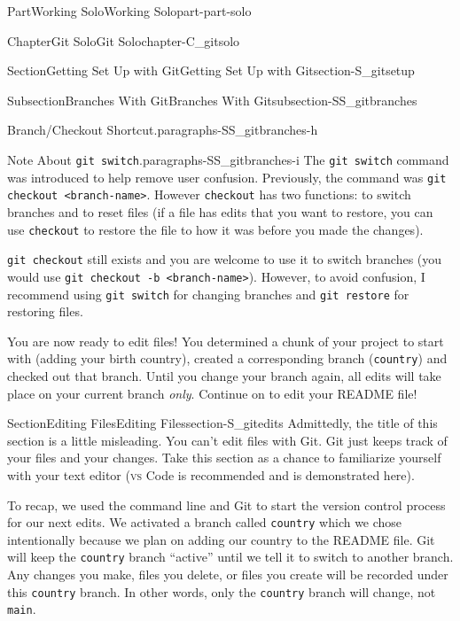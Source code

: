 \documentclass[oneside,10pt,]{book}
\newcommand{\mono}[1]{\texttt{#1}}
\newcommand{\initialism}[1]{\textsc{\MakeLowercase{#1}}}
\begin{document}
\begin{partptx}{Part}{Working Solo}{}{Working Solo}{}{}{part-part-solo}
\begin{chapterptx}{Chapter}{Git Solo}{}{Git Solo}{}{}{chapter-C_gitsolo}
\begin{sectionptx}{Section}{Getting Set Up with Git}{}{Getting Set Up with Git}{}{}{section-S_gitsetup}
\begin{subsectionptx}{Subsection}{Branches With Git}{}{Branches With Git}{}{}{subsection-SS_gitbranches}
\begin{paragraphs}{Branch\slash{}Checkout Shortcut.}{paragraphs-SS_gitbranches-h}
\end{paragraphs}%
\begin{paragraphs}{Note About \mono{git switch}.}{paragraphs-SS_gitbranches-i}%
The \mono{git switch} command was introduced to help remove user confusion. Previously, the command was \mono{git checkout <branch-name>}. However \mono{checkout} has two functions: to switch branches and to reset files (if a file has edits that you want to restore, you can use \mono{checkout} to restore the file to how it was before you made the changes).%
\par
\mono{git checkout} still exists and you are welcome to use it to switch branches (you would use \mono{git checkout -b <branch-name>}). However, to avoid confusion, I recommend using \mono{git switch} for changing branches and \mono{git restore} for restoring files.%
\end{paragraphs}%
\end{subsectionptx}
\begin{conclusion}{}%
You are now ready to edit files! You determined a chunk of your project to start with (adding your birth country), created a corresponding branch (\mono{country}) and checked out that branch. Until you change your branch again, all edits will take place on your current branch \emph{only}. Continue on to edit your README file!%
\end{conclusion}%
\end{sectionptx}
%
%
\typeout{************************************************}
\typeout{************************************************}
%
\begin{sectionptx}{Section}{Editing Files}{}{Editing Files}{}{}{section-S_gitedits}
%
%
%
Admittedly, the title of this section is a little misleading. You can't edit files with Git. Git just keeps track of your files and your changes. Take this section as a chance to familiarize yourself with your text editor (\initialism{VS} Code is recommended and is demonstrated here).%
\par
To recap, we used the command line and Git to start the version control process for our next edits. We activated a branch called \mono{country} which we chose intentionally because we plan on adding our country to the README file. Git will keep the \mono{country} branch ``active'' until we tell it to switch to another branch. Any changes you make, files you delete, or files you create will be recorded under this \mono{country} branch. In other words, only the \mono{country} branch will change, not \mono{main}.%

\end{sectionptx}
\end{chapterptx}
\end{partptx}
\end{document}
